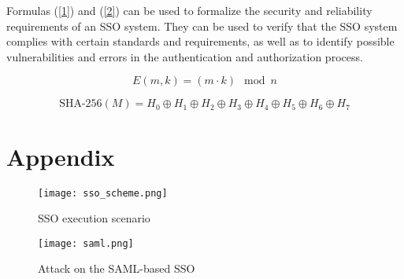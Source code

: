 \documentclass[a4paper,12pt,oneside]{mybook}
\begin{document}
Formulas (\ref{1}) and (\ref{2})
can be used to formalize the security and reliability requirements of an SSO system. They can be used to verify that the SSO system complies with certain standards and requirements, as well as to identify possible vulnerabilities and errors in the authentication and authorization process.

\begin{equation}
    E(m, k) = (m \cdot k) \mod n
    \label{1}
\end{equation}

\begin{equation}
    \text{SHA-256}(M) = H_0 \oplus H_1 \oplus H_2 \oplus H_3 \oplus H_4 \oplus H_5 \oplus H_6 \oplus H_7
    \label{2}
\end{equation}

\clearpage

\section{Appendix}
\begin{figure}[!ht]
    \centering
    \texttt{[image: sso\_scheme.png]}
    \caption{SSO execution scenario}
    \label{sso_img}
\end{figure}

\begin{figure}[!ht]
    \centering
    \texttt{[image: saml.png]}
    \caption{Attack on the SAML-based SSO}
    \label{saml_img}
\end{figure}
\end{document}
